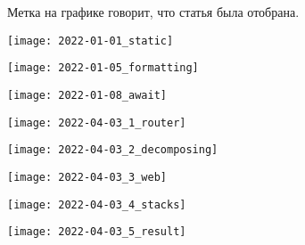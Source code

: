 
Метка  на графике говорит, что статья была отобрана.

\begin{center}
    \texttt{[image: 2022-01-01\_static]}
\end{center}
\pagebreak

\begin{center}
    \texttt{[image: 2022-01-05\_formatting]}
\end{center}
\pagebreak

\begin{center}
    \texttt{[image: 2022-01-08\_await]}
\end{center}
\pagebreak

\begin{center}
    \texttt{[image: 2022-04-03\_1\_router]}
\end{center}
\pagebreak

\begin{center}
    \texttt{[image: 2022-04-03\_2\_decomposing]}
\end{center}
\pagebreak

\begin{center}
    \texttt{[image: 2022-04-03\_3\_web]}
\end{center}
\pagebreak

\begin{center}
    \texttt{[image: 2022-04-03\_4\_stacks]}
\end{center}
\pagebreak

\begin{center}
    \texttt{[image: 2022-04-03\_5\_result]}
\end{center}

\pagebreak

